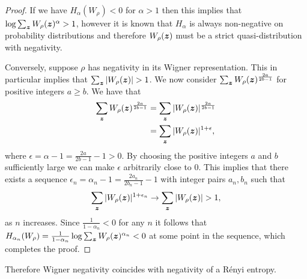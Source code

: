 \documentclass[pra,
aps,
twocolumn,
superscriptaddress,
groupedaddress,
nofootinbib,
reprint
]{revtex4-1}
\begin{document}
\addtocounter{theorem}{-1}
\endgroup
\begin{proof} 
If we have $H_\alpha (W_\rho) <0 $ for $\alpha >1$ then this implies that $\log \sum_{\bm{z}} W_\rho (\bm{z})^\alpha > 1$, however it is known that $H_\alpha$ is always non-negative on probability distributions and therefore $W_\rho(\bm{z})$ must be a strict quasi-distribution with negativity.

Conversely, suppose $\rho$ has negativity in its Wigner representation. This in particular implies that $\sum_{\bm{z}} |W_\rho (\bm{z})| >1$. We now consider $\sum_{\bm{z}} W_\rho (\bm{z})^{\frac{2a}{2b-1}}$ for positive integers $a\ge b$. We have that
\begin{align}
\sum_{\bm{z}} W_\rho (\bm{z})^{\frac{2a}{2b-1}} &= \sum_{\bm{z}} |W_\rho (\bm{z})|^{\frac{2a}{2b-1}} \nonumber \\
&= \sum_{\bm{z}} |W_\rho (\bm{z})|^{1+ \epsilon},
\end{align}
where $\epsilon = \alpha -1=\frac{2a}{2b-1} - 1 >0$. By choosing the positive integers $a$ and $b$ sufficiently large we can make $\epsilon$ arbitrarily close to $0$. This implies that there exists a sequence $\epsilon_n= \alpha_n-1 =\frac{2a_n}{2b_n-1} - 1$ with integer pairs $a_n, b_n$ such that
\begin{equation}
\sum_{\bm{z}} |W_\rho (\bm{z})|^{1+ \epsilon_n} \rightarrow \sum_{\bm{z}} |W_\rho (\bm{z})| >1,
\end{equation}
as $n$ increases.
Since $\frac{1}{1-\alpha_n} <0$ for any $n$ it follows that $H_{\alpha_n} (W_\rho) = \frac{1}{1-\alpha_n} \log \sum_{\bm{z}} W_\rho (\bm{z})^{\alpha_n}  <0 $ at some point in the sequence, which completes the proof.
\end{proof}
Therefore Wigner negativity coincides with negativity of a R\'{e}nyi entropy.
\end{document}
